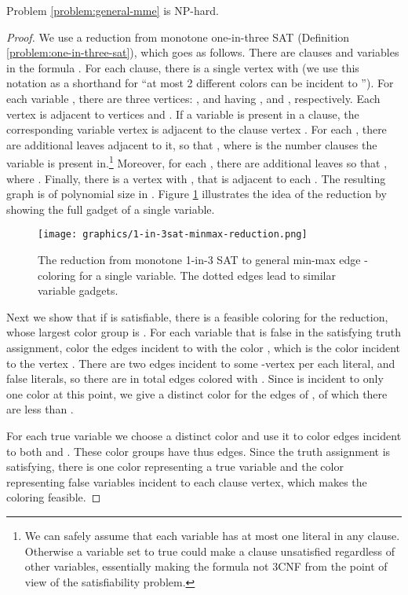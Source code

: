 \documentclass[runningheads, a4paper]{llncs}
\begin{document}
\begin{theorem}\label{theorem:general-mme-np-hard}
Problem \ref{problem:general-mme} is NP-hard.
\end{theorem}
\begin{proof}
We use a reduction from monotone one-in-three SAT (Definition \ref{problem:one-in-three-sat}), which goes as follows. There are  clauses and  variables in the formula . For each clause, there is a single vertex  with  (we use this notation as a shorthand for ``at most 2 different colors can be incident to ''). For each variable , there are three vertices: ,  and  having ,  and , respectively. Each vertex  is adjacent to vertices  and . If a variable is present in a clause, the corresponding variable vertex  is adjacent to the clause vertex . For each , there are additional leaves adjacent to it, so that , where  is the number clauses the variable is present in.\footnote{We can safely assume that each variable has at most one literal in any clause. Otherwise a variable set to true could make a clause unsatisfied regardless of other variables, essentially making the formula not 3CNF from the point of view of the satisfiability problem.} Moreover, for each , there are additional leaves so that , where .  Finally, there is a vertex  with , that is adjacent to each . The resulting graph is of polynomial size in . Figure \ref{img:1-in-3sat-minmax-reduction} illustrates the idea of the reduction by showing the full gadget of a single variable.

\begin{figure}[htb]
\centering \texttt{[image: graphics/1-in-3sat-minmax-reduction.png]}
\caption{The reduction from monotone 1-in-3 SAT to general min-max edge -coloring for a single variable. The dotted edges lead to similar variable gadgets.}\label{img:1-in-3sat-minmax-reduction}
\end{figure}

Next we show that if  is satisfiable, there is a feasible coloring for the reduction, whose largest color group is . For each variable  that is false in the satisfying truth assignment, color the edges incident to  with the color , which is the color incident to the vertex . There are two edges incident to some -vertex per each literal, and  false literals, so there are in total  edges colored with . Since  is incident to only one color at this point, we give a distinct color for the edges of , of which there are less than .

For each true variable  we choose a distinct color and use it to color edges incident to both  and . These color groups have thus  edges. Since the truth assignment is satisfying, there is one color representing a true variable and the color  representing false variables incident to each clause vertex, which makes the coloring feasible.


\end{proof}
\end{document}
